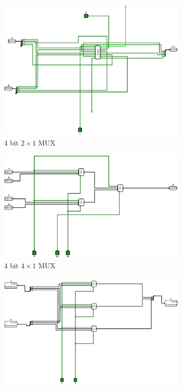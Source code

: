 \documentclass[12pt]{article}
\begin{document}
\begin{figure}[H]
    \centering
    \begin{subfigure}[b]{0.3\textwidth}
        \includegraphics[width=\textwidth]{Images/4MUX2X1.png}
        \caption{4 bit $2\times1$ MUX}
        \label{fig:4b2x1mux}
    \end{subfigure}
    \begin{subfigure}[b]{0.3\textwidth}
        \includegraphics[width=\textwidth]{Images/4MUX4X1.png}
        \caption{4 bit $4\times1$ MUX}
        \label{fig:4b4x1mux}
    \end{subfigure}
    \begin{subfigure}[b]{0.3\textwidth}
        \includegraphics[width=\textwidth]{Images/12MUX2X1.png}

\end{subfigure}
\end{figure}
\end{document}
